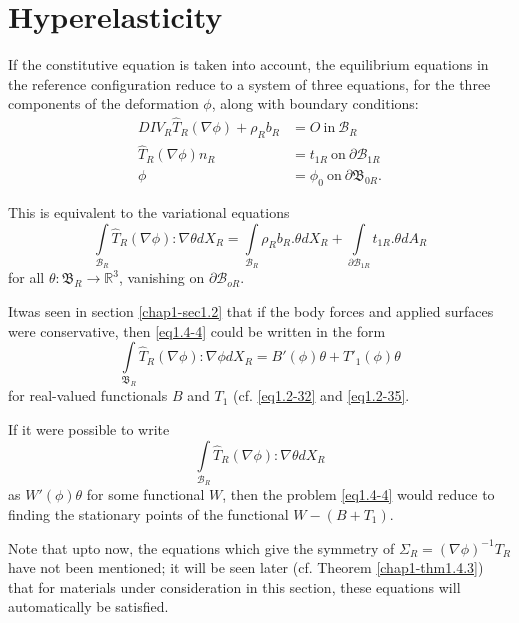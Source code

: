 \section{Hyperelasticity}\label{chap1-sec1.4}%

If the constitutive equation is taken into account, the equilibrium
equations in the reference configuration reduce to a system of three
equations, for the three components of the deformation $\phi$, along
with boundary conditions: 
\begin{align*}
  DIV_R \hat{T}_R (\nabla\phi ) + \rho_R b_R & = O ~\text{in}~
  \mathcal{B}_R\tag{1.4-1}\label{eq1.4-1} \\
  \hat{T}_R(\nabla\phi )n_R & = t_{1R} ~\text{on}~
  \partial\mathcal{B}_{1R}\tag{1.4-2}\label{eq1.4-2} \\
  \phi & = \phi_0 ~\text{on}~
  \partial\mathfrak{B}_{0R}. \tag{1.4-3}\label{eq1.4-3} 
\end{align*}

This is equivalent to the variational equations
\begin{equation*}
\int\limits_{\mathcal{B}_R} \hat{T}_R(\nabla \phi ) :
\nabla \theta dX_R = \int\limits_{\mathcal{B}_R} \rho_R
b_R. \theta dX_R + \int\limits_{\partial \mathcal{B}_{1R}}
t_{1R}. \theta dA_R\tag{1.4-4} \label{eq1.4-4}
\end{equation*}
for all $\theta : \mathfrak{B}_R \rightarrow \mathbb{R}^3$, vanishing
on $\partial\mathcal{B}_{oR}$.

It\pageoriginale was seen in section \ref{chap1-sec1.2} that if the
body forces and applied 
surfaces were conservative, then \eqref{eq1.4-4} could be written in the
form 
\begin{equation*}
  \int\limits_{\mathfrak{B}_R} \hat{T}_R
  (\nabla\phi):\nabla\phi dX_R = B'(\phi ) \theta +
  T'_1(\phi)\theta \tag{1.4-5} \label{eq1.4-5}
\end{equation*}
for real-valued functionals $B$ and $T_1$ (cf. \eqref{eq1.2-32} and
\eqref{eq1.2-35}.  

If it were possible to write
$$
\int\limits_{\mathcal{B}_R} \hat{T}_R(\nabla\phi) :
\nabla\theta dX_R 
$$
as $W'(\phi)\theta$ for some functional $W$, then the problem
\eqref{eq1.4-4} would reduce to finding the stationary points of the
functional $W -(B+T_1)$.  

Note that upto now, the equations which give the symmetry of $\Sigma_R
= (\nabla\phi)^{-1} T_R$ have not been mentioned; it will be
seen later (cf. Theorem \ref{chap1-thm1.4.3}) that for materials under
consideration in this section, these equations will automatically be
satisfied.  

